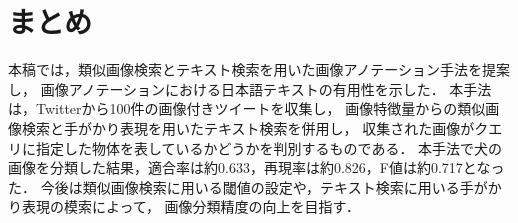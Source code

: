 \chapter{まとめ}
\label{sec:format}
本稿では，類似画像検索とテキスト検索を用いた画像アノテーション手法を提案し，
画像アノテーションにおける日本語テキストの有用性を示した．
本手法は，Twitterから100件の画像付きツイートを収集し，
画像特徴量からの類似画像検索と手がかり表現を用いたテキスト検索を併用し，
収集された画像がクエリに指定した物体を表しているかどうかを判別するものである．
本手法で犬の画像を分類した結果，適合率は約0.633，再現率は約0.826，F値は約0.717となった．
今後は類似画像検索に用いる閾値の設定や，テキスト検索に用いる手がかり表現の模索によって，
画像分類精度の向上を目指す．